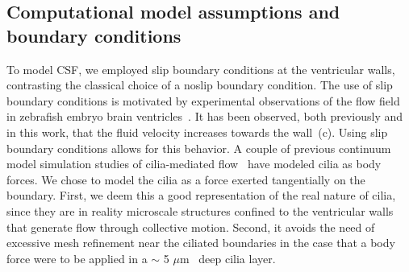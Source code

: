 \documentclass[fleqn]{wlscirep}
\begin{document}
\subsection*{Computational model assumptions and boundary conditions}
To model CSF, we employed slip boundary conditions at the ventricular walls,
contrasting the classical choice of a noslip boundary condition.
The use of slip boundary conditions is motivated by experimental observations of the
flow field in zebrafish embryo brain ventricles~\cite{Olstad2019CiliaryDevelopment}.
It has been observed, both previously and in this work, that the fluid velocity increases towards the wall~(c).
Using slip boundary conditions allows for this behavior.
A couple of previous continuum model simulation studies of cilia-mediated flow~\cite{Siyahhan2014FlowVentricles, Thouvenin2020OriginCanal}
have modeled cilia as body forces. We chose to model the cilia as a force exerted tangentially on the boundary.
First, we deem this a good representation of the real nature of cilia,
since they are in reality microscale structures confined to the ventricular walls that
generate flow through collective motion. Second, it avoids the need of excessive mesh
refinement near the ciliated boundaries in the case that a
body force were to be applied in a $\sim$ 5 $\mu$m~\cite{Salman2022ComputationalEmbryo} deep cilia layer.
\end{document}
